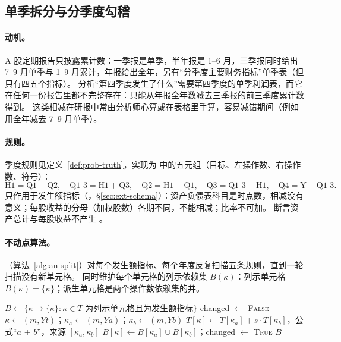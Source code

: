 \subsection{单季拆分与分季度勾稽}
\label{sec:an-quarter}

\paragraph{动机。}
A 股定期报告只披露累计数：一季报是单季，半年报是 1--6 月，三季报同时给出 7--9 月单季与 1--9 月累计，年报给出全年，另有“分季度主要财务指标”单季表（但只有四五个指标）。
分析“第四季度发生了什么”需要第四季度的单季利润表，而它在任何一份报告里都不完整存在：只能从年报全年数减去三季报的前三季度累计数得到。
这类相减在研报中常由分析师心算或在表格里手算，容易减错期间（例如用全年减去 7--9 月单季）。

\paragraph{规则。}
季度规则见定义~\ref{def:prob-truth}，实现为  中的五元组（目标、左操作数、右操作数、符号）：
\[
\text{H1}=\text{Q1}+\text{Q2},\quad \text{Q1-3}=\text{H1}+\text{Q3},\quad \text{Q2}=\text{H1}-\text{Q1},\quad \text{Q3}=\text{Q1-3}-\text{H1},\quad \text{Q4}=\text{Y}-\text{Q1-3}.
\]
只作用于发生额指标（，\S\ref{sec:ext-schema}）：资产负债表科目是时点数，相减没有意义；每股收益的分母（加权股数）各期不同，不能相减；比率不可加。
 断言资产总计与每股收益不产生 。

\paragraph{不动点算法。}
（算法~\ref{alg:an-split}）对每个发生额指标、每个年度反复扫描五条规则，直到一轮扫描没有新单元格。
同时维护每个单元格的列示依赖集 $B(\kappa)$：列示单元格 $B(\kappa)=\{\kappa\}$；派生单元格是两个操作数依赖集的并。

\begin{algorithm}[t]
\caption{单季拆分 }
\label{alg:an-split}
\begin{algorithmic}[1]
  \State $B\gets\{\kappa\mapsto\{\kappa\} : \kappa\in T \text{ 为列示单元格且为发生额指标}\}$
    \Repeat
      \State changed $\gets$ \textsc{False}
        \State $\kappa\gets(m,Yt)$；$\kappa_a\gets(m,Ya)$；$\kappa_b\gets(m,Yb)$ 
          \State $T[\kappa]\gets T[\kappa_a]+s\cdot T[\kappa_b]$，公式“$a$ $\pm$ $b$”，来源 $[\kappa_a,\kappa_b]$
          \State $B[\kappa]\gets B[\kappa_a]\cup B[\kappa_b]$；changed $\gets$ \textsc{True}
        \EndIf
      \EndFor
  \EndFor
  \State \Return $B$
\EndFunction
\end{algorithmic}
\end{algorithm}

